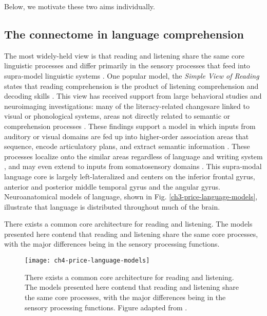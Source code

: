 Below, we motivate these two aims individually.

\subsection{The connectome in language comprehension}


The most widely-held view is that reading and listening share the same core linguistic processes and differ primarily in the sensory processes that feed into supra-model linguistic systems \citep{Mattingly1971, Price2012}. One popular model, the \textit{Simple View of Reading} states that reading comprehension is the product of listening comprehension and decoding skills \citep{Gough1986}. This view has received support from large behavioral studies \citep{Kirby2008} and neuroimaging investigations: many of the literacy-related changesare linked to visual or phonological systems, areas not directly related to semantic or comprehension processes \citep{Schlaggar2007, Dehaene2015}. These findings support a model in which inputs from auditory or visual domains are fed up into higher-order association areas that sequence, encode articulatory plans, and extract semantic information \citep{Price2012}. These processes localize onto the similar areas regardless of language and writing system \citep{Rueckl2016}, and may even extend to inputs from somatosensory domains \citep{Xu2005, Sood2016}. This supra-modal language core is largely left-lateralized and centers on the inferior frontal gyrus, anterior and posterior middle temporal gyrus and the angular gyrus. Neuroanatomical models of language, shown in Fig. \ref{ch3-price-language-models}, illustrate that language is distributed throughout much of the brain. 

There exists a common core architecture for reading and listening. The models presented here contend that reading and listening share the same core processes, with the major differences being in the sensory processing functions.

\begin{figure}[t]
	\centering
	\texttt{[image: ch4-price-language-models]}
    \caption[Common core architecture for reading and listening.]{There exists a common core architecture for reading and listening. The models presented here contend that reading and listening share the same core processes, with the major differences being in the sensory processing functions. Figure adapted from \citep{Price2012}.}
	\label{fig:ch4-price-language-models}
\end{figure}

